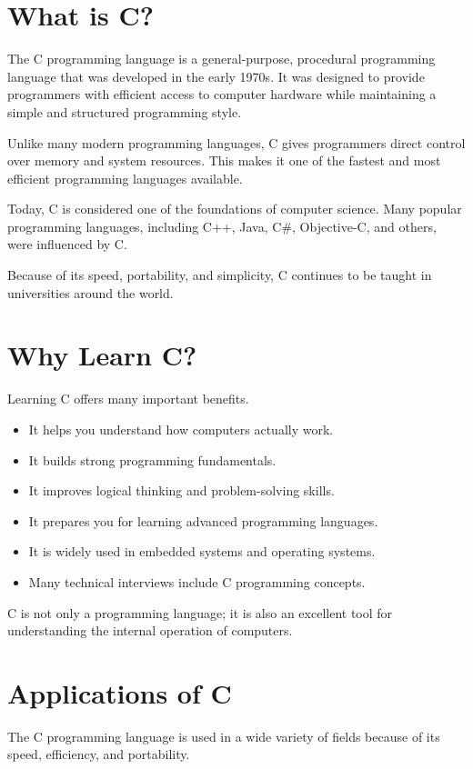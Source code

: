 \documentclass[12pt,openany]{book}
\begin{document}
\section{What is C?}

The C programming language is a general-purpose, procedural programming language that was developed in the early 1970s. It was designed to provide programmers with efficient access to computer hardware while maintaining a simple and structured programming style.

Unlike many modern programming languages, C gives programmers direct control over memory and system resources. This makes it one of the fastest and most efficient programming languages available.

Today, C is considered one of the foundations of computer science. Many popular programming languages, including C++, Java, C\#, Objective-C, and others, were influenced by C.

Because of its speed, portability, and simplicity, C continues to be taught in universities around the world.

\section{Why Learn C?}

Learning C offers many important benefits.

\begin{itemize}
    \item It helps you understand how computers actually work.
    \item It builds strong programming fundamentals.
    \item It improves logical thinking and problem-solving skills.
    \item It prepares you for learning advanced programming languages.
    \item It is widely used in embedded systems and operating systems.
    \item Many technical interviews include C programming concepts.
\end{itemize}

C is not only a programming language; it is also an excellent tool for understanding the internal operation of computers.
\section{Applications of C}

The C programming language is used in a wide variety of fields because of its speed, efficiency, and portability.
\end{document}
